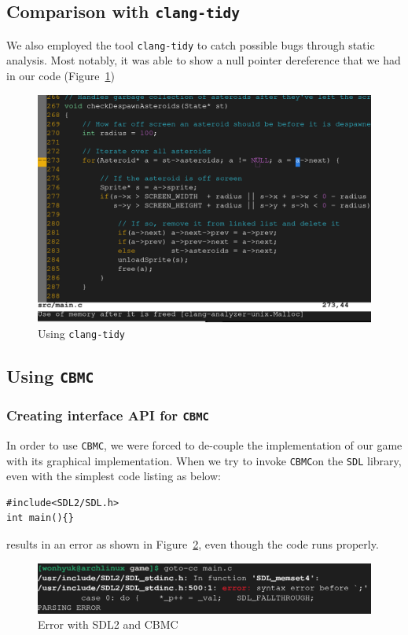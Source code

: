 \documentclass{article}
\newcommand{\cbmc}{\texttt{CBMC}}
\begin{document}
\subsection{Comparison with \texttt{clang-tidy}}
We also employed the tool \texttt{clang-tidy} to catch possible bugs through static analysis.
Most notably, it was able to show a null pointer dereference that we had in our code (Figure~\ref{fig:clang-tidy})
\begin{figure}[!h]
    \includegraphics[width=\linewidth]{clang-tidy.png}
    \caption{Using \texttt{clang-tidy}}
    \label{fig:clang-tidy}
\end{figure}

\subsection{Using \cbmc}
\subsubsection{Creating interface API for \cbmc}
In order to use \cbmc, we were forced to de-couple the implementation of our game with its graphical implementation.
When we try to invoke \cbmc on the \texttt{SDL} library, even with the simplest code listing as below:
\begin{verbatim}
#include<SDL2/SDL.h>
int main(){}
\end{verbatim}
results in an error as shown in Figure~\ref{fig:cbmc-sdl}, even though the code runs properly.

\begin{figure}[!h]
    \includegraphics[width=\linewidth]{cbmc-sdl.png}
    \caption{Error with SDL2 and CBMC}
    \label{fig:cbmc-sdl}
\end{figure}
\end{document}
